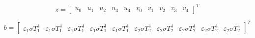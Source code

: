 %





\begin{equation}
 z ={ \begin{bmatrix}
 u_0 & 
u_1 &
 u_2 &
 u_3 &
 u_4 &
 v_0 &
 v_1 &
 v_2 &
 v_3 &
 v_4 
 \end{bmatrix} }^{ T } 
 \label{eq:x}
\end{equation}

\begin{equation}
 b ={ \begin{bmatrix}
 \varepsilon_1 \sigma T_1^4 &
 \varepsilon_1 \sigma T_1^4&
 \varepsilon_1 \sigma T_1^4&
 \varepsilon_1 \sigma T_1^4&
 \varepsilon_1 \sigma T_1^4&
 \varepsilon_2 \sigma T_2^4&
 \varepsilon_2 \sigma T_2^4&
 \varepsilon_2 \sigma T_2^4&
 \varepsilon_2 \sigma T_2^4&
 \varepsilon_2 \sigma T_2^4
 \end{bmatrix} }^{ T } 
 \label{eq:b}
\end{equation}


